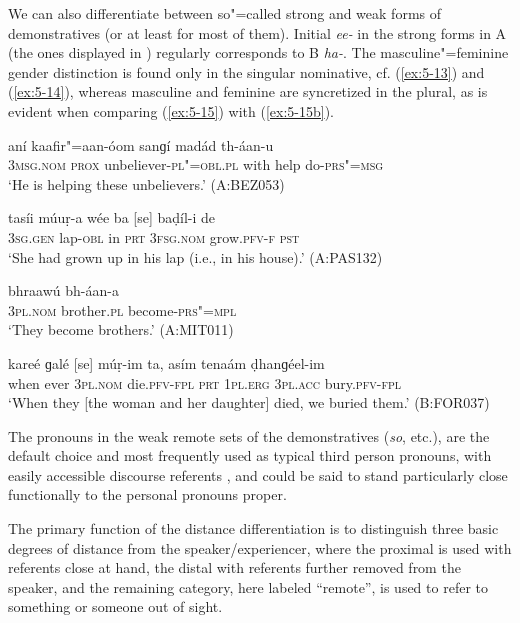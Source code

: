 We can also differentiate between so"=called strong and weak forms of demonstratives (or at least for most of them). Initial \textit{ee-} in the strong forms in A (the ones displayed in ) regularly corresponds to B \textit{ha-}. The masculine"=feminine gender distinction is found only in the singular nominative, cf. (\ref{ex:5-13}) and (\ref{ex:5-14}), whereas masculine and feminine are syncretized in the plural, as is evident when comparing (\ref{ex:5-15}) with (\ref{ex:5-15b}). 


\begin{exe}
\ex
\label{ex:5-13}
\gll [so] aní kaafir"=aan-óom sanɡí madád th-áan-u \\
\textsc{3msg}.\textsc{nom} \textsc{prox} unbeliever-\textsc{pl"=obl.pl} with help do-\textsc{prs"=msg}\\
\glt `He is helping these unbelievers.' (A:BEZ053)

\ex
\label{ex:5-14}
\gll tasíi múuṛ-a wée ba [se] baḍíl-i de \\
\textsc{3sg}.\textsc{gen} lap-\textsc{obl} in \textsc{prt} \textsc{3fsg}.\textsc{nom}
grow.\textsc{pfv-f} \textsc{pst}\\
\glt `She had grown up in his lap (i.e., in his house).' (A:PAS132)

\ex
\label{ex:5-15}
\gll [se] bhraawú bh-áan-a\\
\textsc{3pl}.\textsc{nom} brother.\textsc{pl} become-\textsc{prs"=mpl}\\
\glt `They become brothers.' (A:MIT011)

\ex
\label{ex:5-15b}
\gll kareé ɡalé [se] múṛ-im ta, asím  tenaám ḍhanɡéel-im\\
when ever \textsc{3pl.nom} die.\textsc{pfv}-\textsc{fpl} \textsc{prt} \textsc{1pl.erg} \textsc{3pl.acc} bury.\textsc{pfv}-\textsc{fpl} \\
\glt `When they [the woman and her daughter] died, we buried them.' (B:FOR037)
\end{exe}

The pronouns in the weak remote sets of the demonstratives (\textit{so}, etc.), are the default choice and most frequently used as typical third person pronouns, with easily accessible discourse referents \citep[432--433]{diessel2006}, and could be said to stand particularly close functionally to the personal pronouns proper. 

The primary function of the distance differentiation is to distinguish three basic degrees of distance from the speaker/experiencer, where the proximal is used with referents close at hand, the distal with referents further removed from the speaker, and the remaining category, here labeled ``remote'', is used to refer to something or someone out of sight. 


